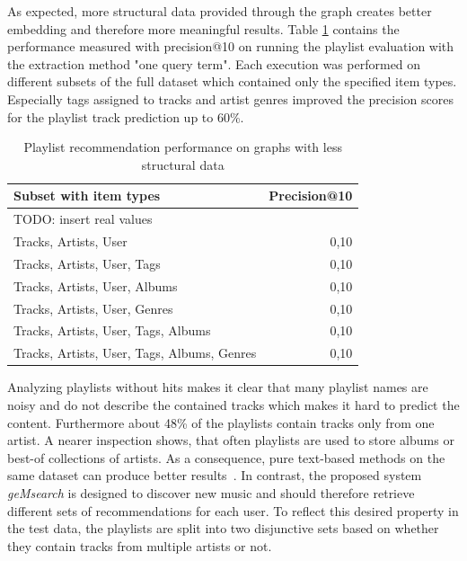 \documentclass[sigconf]{acmart}
\newcommand{\ce}[1]{\textcolor{blue}{[Chris] #1}}
\newcommand{\ce}[1]{}
\begin{document}
As expected, more structural data provided through the graph creates better embedding and therefore more meaningful results. Table \ref{table:sub_data} contains the performance measured with precision@10 on running the playlist evaluation with the extraction method "one query term". Each execution was performed on different subsets of the full dataset which contained only the specified item types. Especially tags assigned to tracks and artist genres improved the precision scores for the playlist track prediction up to 60\%.

\begin{table}[H]
	\caption{Playlist recommendation performance on graphs with less structural data}
	\label{table:sub_data}
	\begin{tabular}{lr}
		\midrule 
		\textbf{Subset with item types} & \textbf{Precision@10} \\ 
		\midrule 
		TODO: insert real values \\
		Tracks, Artists, User & 0,10  \\
		Tracks, Artists, User, Tags     & 0,10     \\
		Tracks, Artists, User, Albums     & 0,10     \\
		Tracks, Artists, User, Genres     & 0,10     \\
		Tracks, Artists, User, Tags, Albums     & 0,10     \\
		Tracks, Artists, User, Tags, Albums, Genres     & 0,10     \\
		\bottomrule
	\end{tabular}
\end{table}

Analyzing playlists without hits makes it clear that many playlist names are noisy and do not describe the contained tracks which makes it hard to predict the content. Furthermore about 48\% of the playlists contain tracks only from one artist. A nearer inspection shows, that often playlists are used to store albums or best-of collections of artists. As a consequence, pure text-based methods on the same dataset can produce better results~\cite{chungexploiting}. In contrast, the proposed system \emph{geMsearch} is designed to discover new music and should therefore retrieve different sets of recommendations for each user. To reflect this desired property in the test data, the playlists are split into two disjunctive sets based on whether they contain tracks from multiple artists or not.
\end{document}
